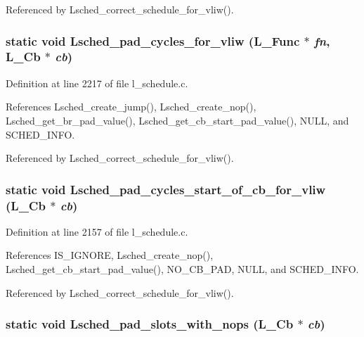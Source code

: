 Referenced by Lsched\_\-correct\_\-schedule\_\-for\_\-vliw().
\subsubsection{\setlength{\rightskip}{0pt plus 5cm}static void Lsched\_\-pad\_\-cycles\_\-for\_\-vliw (L\_\-Func $\ast$ {\em fn}, L\_\-Cb $\ast$ {\em cb})\hspace{0.3cm}{\tt  [static]}}\label{l__schedule_8c_219e20eb7ceb63961aab25b01b50708e}




Definition at line 2217 of file l\_\-schedule.c.

References Lsched\_\-create\_\-jump(), Lsched\_\-create\_\-nop(), Lsched\_\-get\_\-br\_\-pad\_\-value(), Lsched\_\-get\_\-cb\_\-start\_\-pad\_\-value(), NULL, and SCHED\_\-INFO.

Referenced by Lsched\_\-correct\_\-schedule\_\-for\_\-vliw().
\subsubsection{\setlength{\rightskip}{0pt plus 5cm}static void Lsched\_\-pad\_\-cycles\_\-start\_\-of\_\-cb\_\-for\_\-vliw (L\_\-Cb $\ast$ {\em cb})\hspace{0.3cm}{\tt  [static]}}\label{l__schedule_8c_285509e2641f69859c90cc655f512dd8}




Definition at line 2157 of file l\_\-schedule.c.

References IS\_\-IGNORE, Lsched\_\-create\_\-nop(), Lsched\_\-get\_\-cb\_\-start\_\-pad\_\-value(), NO\_\-CB\_\-PAD, NULL, and SCHED\_\-INFO.

Referenced by Lsched\_\-correct\_\-schedule\_\-for\_\-vliw().
\subsubsection{\setlength{\rightskip}{0pt plus 5cm}static void Lsched\_\-pad\_\-slots\_\-with\_\-nops (L\_\-Cb $\ast$ {\em cb})\hspace{0.3cm}{\tt  [static]}}\label{l__schedule_8c_7d13a484c6cb9d6e9717830d702cca04}




